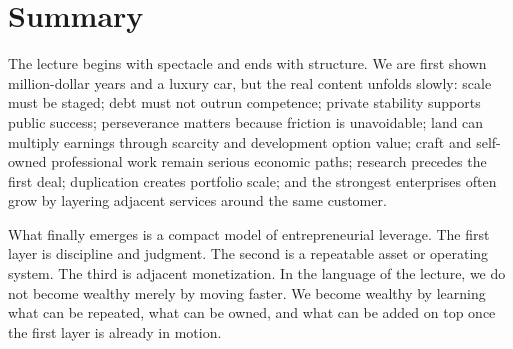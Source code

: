 \section{Summary}

The lecture begins with spectacle and ends with structure. We are first shown million-dollar years and a luxury car, but the real content unfolds slowly: scale must be staged; debt must not outrun competence; private stability supports public success; perseverance matters because friction is unavoidable; land can multiply earnings through scarcity and development option value; craft and self-owned professional work remain serious economic paths; research precedes the first deal; duplication creates portfolio scale; and the strongest enterprises often grow by layering adjacent services around the same customer.

What finally emerges is a compact model of entrepreneurial leverage. The first layer is discipline and judgment. The second is a repeatable asset or operating system. The third is adjacent monetization. In the language of the lecture, we do not become wealthy merely by moving faster. We become wealthy by learning what can be repeated, what can be owned, and what can be added on top once the first layer is already in motion.
